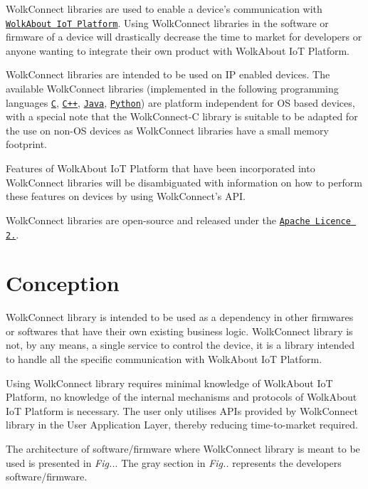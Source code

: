 Wolk\+Connect libraries are used to enable a device’s communication with \href{https://demo.wolkabout.com/#/login}{\tt Wolk\+About IoT Platform}. Using Wolk\+Connect libraries in the software or firmware of a device will drastically decrease the time to market for developers or anyone wanting to integrate their own product with Wolk\+About IoT Platform.

Wolk\+Connect libraries are intended to be used on IP enabled devices. The available Wolk\+Connect libraries (implemented in the following programming languages \href{https://github.com/Wolkabout/WolkConnect-C}{\tt C}, \href{https://github.com/Wolkabout/WolkConnect-Cpp}{\tt C++}, \href{https://github.com/Wolkabout/WolkConnect-Java-}{\tt Java}, \href{https://github.com/Wolkabout/WolkConnect-Python}{\tt Python}) are platform independent for OS based devices, with a special note that the Wolk\+Connect-\/C library is suitable to be adapted for the use on non-\/\+OS devices as Wolk\+Connect libraries have a small memory footprint.

Features of Wolk\+About IoT Platform that have been incorporated into Wolk\+Connect libraries will be disambiguated with information on how to perform these features on devices by using Wolk\+Connect’s A\+PI.

Wolk\+Connect libraries are open-\/source and released under the \href{https://github.com/Wolkabout/WolkConnect-C/blob/master/LICENSE}{\tt Apache Licence 2.}. 

 \section*{Conception}





Wolk\+Connect library is intended to be used as a dependency in other firmwares or softwares that have their own existing business logic. Wolk\+Connect library is not, by any means, a single service to control the device, it is a library intended to handle all the specific communication with Wolk\+About IoT Platform.

Using Wolk\+Connect library requires minimal knowledge of Wolk\+About IoT Platform, no knowledge of the internal mechanisms and protocols of Wolk\+About IoT Platform is necessary. The user only utilises A\+P\+Is provided by Wolk\+Connect library in the User Application Layer, thereby reducing time-\/to-\/market required.

The architecture of software/firmware where Wolk\+Connect library is meant to be used is presented in {\itshape Fig..}. The gray section in {\itshape Fig..} represents the developer\textquotesingle{}s software/firmware.

